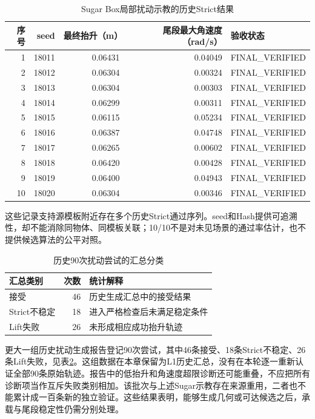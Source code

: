\begin{table}[htbp]
 \centering\small
 \caption{Sugar Box局部扰动示教的历史Strict结果}
 \label{tab:ch03_sugar_strict}
 \begin{tabular}{rrrrl}
 \hline
 序号 & seed & 最终抬升（m） & 尾段最大角速度（rad/s） & 验收状态\\
 \hline
 1 & 18011 & 0.06431 & 0.04049 & FINAL\_VERIFIED\\
 2 & 18012 & 0.06304 & 0.00324 & FINAL\_VERIFIED\\
 3 & 18013 & 0.06304 & 0.00303 & FINAL\_VERIFIED\\
 4 & 18014 & 0.06299 & 0.00311 & FINAL\_VERIFIED\\
 5 & 18015 & 0.06115 & 0.05234 & FINAL\_VERIFIED\\
 6 & 18016 & 0.06387 & 0.04748 & FINAL\_VERIFIED\\
 7 & 18017 & 0.06265 & 0.00602 & FINAL\_VERIFIED\\
 8 & 18018 & 0.06420 & 0.00428 & FINAL\_VERIFIED\\
 9 & 18019 & 0.06400 & 0.04943 & FINAL\_VERIFIED\\
 10 & 18020 & 0.06304 & 0.00346 & FINAL\_VERIFIED\\
 \hline
 \end{tabular}
\end{table}

这些记录支持源模板附近存在多个历史Strict通过序列。seed和Hash提供可追溯性，却不能消除同物体、同模板关联；10/10不是对未见场景的通过率估计，也不提供候选算法的公平对照。

\begin{table}[htbp]
 \centering\small
 \caption{历史90次扰动尝试的汇总分类}
 \label{tab:ch03_generation_failures}
 \begin{tabular}{lrp{}}
 \hline
 汇总类别 & 次数 & 统计解释\\
 \hline
 接受 & 46 & 历史生成汇总中的接受结果\\
 Strict不稳定 & 18 & 进入严格检查后未满足稳定条件\\
 Lift失败 & 26 & 未形成相应成功抬升轨迹\\
 \hline
 \end{tabular}
\end{table}

更大一组历史扰动生成报告登记90次尝试，其中46条接受、18条Strict不稳定、26条Lift失败，见表\ref{tab:ch03_generation_failures}。这组数据在本章保留为L1历史汇总，没有在本轮逐一重新认证全部90条原始轨迹。报告中的低抬升和角速度超限诊断还可能重叠，不应把所有诊断项当作互斥失败类别相加。该批次与上述Sugar示教存在来源重用，二者也不能累计成一百条新的独立验证。这些结果表明，能够生成几何或可达候选之后，承载与尾段稳定性仍需分别处理。

